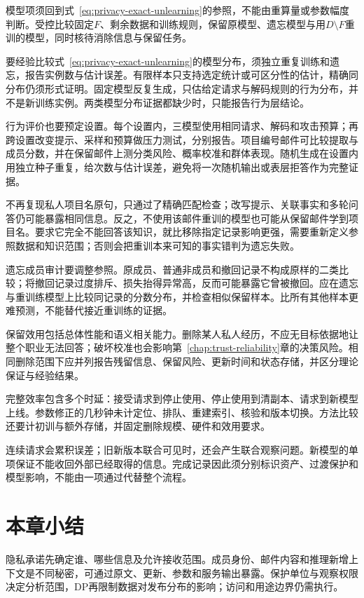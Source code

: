 模型项须回到式~\eqref{eq:privacy-exact-unlearning}的参照，不能由重算量或参数幅度判断。受控比较固定$F$、剩余数据和训练规则，保留原模型、遗忘模型与用$D\setminus F$重训的模型，同时核待消除信息与保留任务。

要经验比较式~\eqref{eq:privacy-exact-unlearning}的模型分布，须独立重复训练和遗忘，报告实例数与估计误差。有限样本只支持选定统计或可区分性的估计，精确同分布仍须形式证明。固定模型反复生成，只估给定请求与解码规则的行为分布，并不是新训练实例。两类模型分布证据都缺少时，只能报告行为层结论。

行为评价也要预定设置。每个设置内，三模型使用相同请求、解码和攻击预算；再跨设置改变提示、采样和预算做压力测试，分别报告。项目编号邮件可比较提取与成员分数，并在保留邮件上测分类风险、概率校准和群体表现。随机生成在设置内用独立种子重复，给次数与估计误差，避免将一次随机输出或表层拒答作为完整证据。

不再复现私人项目名原句，只通过了精确匹配检查；改写提示、关联事实和多轮问答仍可能暴露相同信息。反之，不使用该邮件重训的模型也可能从保留邮件学到项目名。要求它完全不能回答该知识，就比移除指定记录影响更强，需要重新定义参照数据和知识范围；否则会把重训本来可知的事实错判为遗忘失败。

遗忘成员审计要调整参照。原成员、普通非成员和撤回记录不构成原样的二类比较；将撤回记录过度排斥、损失抬得异常高，反而可能暴露它曾被撤回。应在遗忘与重训练模型上比较同记录的分数分布，并检查相似保留样本。比所有其他样本更难预测，不能替代接近重训练的证据。

保留效用包括总体性能和语义相关能力。删除某人私人经历，不应无目标依据地让整个职业无法回答；破坏校准也会影响第~\ref{chap:trust-reliability}章的决策风险。相同删除范围下应并列报告残留信息、保留风险、更新时间和状态存储，并区分理论保证与经验结果。

完整效率包含多个时延：接受请求到停止使用、停止使用到清副本、请求到新模型上线。参数修正的几秒钟未计定位、排队、重建索引、核验和版本切换。方法比较还要计初训与额外存储，并固定删除规模、硬件和效用要求。

连续请求会累积误差；旧新版本联合可见时，还会产生联合观察问题。新模型的单项保证不能收回外部已经取得的信息。完成记录因此须分别标识资产、过渡保护和模型影响，不能由一项通过代替整个流程。

\section{本章小结}
\label{sec:privacy-summary}

隐私承诺先确定谁、哪些信息及允许接收范围。成员身份、邮件内容和推理新增上下文是不同秘密，可通过原文、更新、参数和服务输出暴露。保护单位与观察权限决定分析范围，DP再限制数据对发布分布的影响；访问和用途边界仍需执行。

